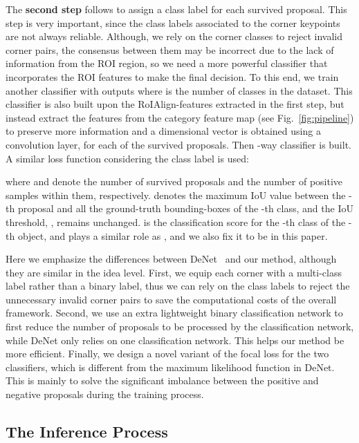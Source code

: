 \documentclass[runningheads]{llncs}
\begin{document}
The \textbf{second step} follows to assign a class label for each survived proposal. This step is very important, since the class labels associated to the corner keypoints are not always reliable. Although, we rely on the corner classes to reject invalid corner pairs, the consensus between them may be incorrect due to the lack of information from the ROI region, so we need a more powerful classifier that incorporates the ROI features to make the final decision.
To this end, we train another classifier with  outputs where  is the number of classes in the dataset. This classifier is also built upon the RoIAlign-features extracted in the first step, but instead extract the features from the category feature map (see Fig.~\ref{fig:pipeline}) to preserve more information and a  dimensional vector is obtained using a  convolution layer, for each of the survived proposals. Then -way classifier is built. A similar loss function considering the class label is used:

where  and  denote the number of survived proposals and the number of positive samples within them, respectively.  denotes the maximum IoU value between the -th proposal and all the ground-truth bounding-boxes of the -th class, and the IoU threshold, , remains unchanged.  is the classification score for the -th class of the -th object, and  plays a similar role as , and we also fix it to be  in this paper.

Here we emphasize the differences between DeNet~\cite{tychsen2017denet} and our method, although they are similar in the idea level. First, we equip each corner with a multi-class label rather than a binary label, thus we can rely on the class labels to reject the unnecessary invalid corner pairs to save the computational costs of the overall framework. Second, we use an extra lightweight binary classification network to first reduce the number of proposals to be processed by the classification network, while DeNet only relies on one classification network. This helps our method be more efficient. Finally, we design a novel variant of the focal loss for the two classifiers, which is different from the maximum likelihood function in DeNet. This is mainly to solve the significant imbalance between the positive and negative proposals during the training process.

\subsection{The Inference Process}
\label{Approach:Classification}
\end{document}
